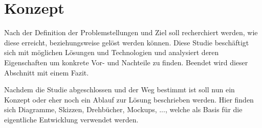 \chapter{Konzept}
Nach der Definition der Problemstellungen und Ziel soll recherchiert werden, wie diese erreicht, beziehungsweise gelöst werden können. Diese Studie beschäftigt sich mit möglichen Lösungen und Technologien und analysiert deren Eigenschaften um konkrete Vor- und Nachteile zu finden.
Beendet wird dieser Abschnitt mit einem Fazit.

Nachdem die Studie abgeschlossen und der Weg bestimmt ist soll nun ein Konzept oder eher noch ein Ablauf zur Lösung beschrieben werden. Hier finden sich Diagramme, Skizzen, Drehbücher, Mockups, ..., welche als Basis für die eigentliche Entwicklung verwendet werden.

